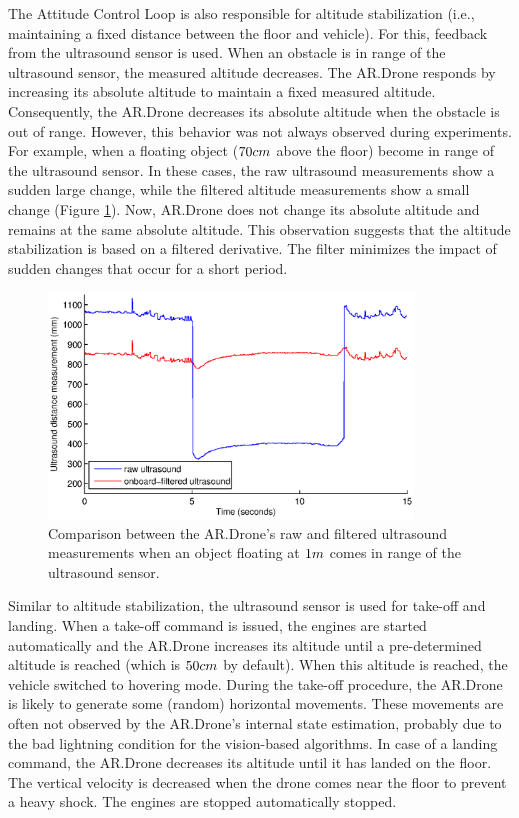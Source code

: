 The Attitude Control Loop is also responsible for altitude stabilization (i.e., maintaining a fixed distance between the floor and vehicle).
For this, feedback from the ultrasound sensor is used.
When an obstacle is in range of the ultrasound sensor, the measured altitude decreases.
The AR.Drone responds by increasing its absolute altitude to maintain a fixed measured altitude.
Consequently, the AR.Drone decreases its absolute altitude when the obstacle is out of range.
However, this behavior was not always observed during experiments.
For example, when a floating object ($70\small{cm}$ above the floor) become in range of the ultrasound sensor.
In these cases, the raw ultrasound measurements show a sudden large change, while the filtered altitude measurements show a small change (Figure \ref{fig:platform-ultasound-raw-filtered}).
Now, AR.Drone does not change its absolute altitude and remains at the same absolute altitude.
This observation suggests that the altitude stabilization is based on a filtered derivative.
The filter minimizes the impact of sudden changes that occur for a short period.

\begin{figure}[htb]
\centering
\includegraphics[height=6cm]{images/altitude_raw_vs_filtered_1m_obstacle.eps}
\caption{Comparison between the AR.Drone's raw and filtered ultrasound measurements when an object floating at  $1\small{m}$ comes in range of the ultrasound sensor.}
\label{fig:platform-ultasound-raw-filtered}
\end{figure}

Similar to altitude stabilization, the ultrasound sensor is used for take-off and landing.
When a take-off command is issued, the engines are started automatically and the AR.Drone increases its altitude until a pre-determined altitude is reached (which is $50\small{cm}$ by default). When this altitude is reached, the vehicle switched to hovering mode.
During the take-off procedure, the AR.Drone is likely to generate some (random) horizontal movements.
These movements are often not observed by the AR.Drone's internal state estimation, probably due to the bad lightning condition for the vision-based algorithms.
In case of a landing command, the AR.Drone decreases its altitude until it has landed on the floor. The vertical velocity is decreased when the drone comes near the floor to prevent a heavy shock.
The engines are stopped automatically stopped.

